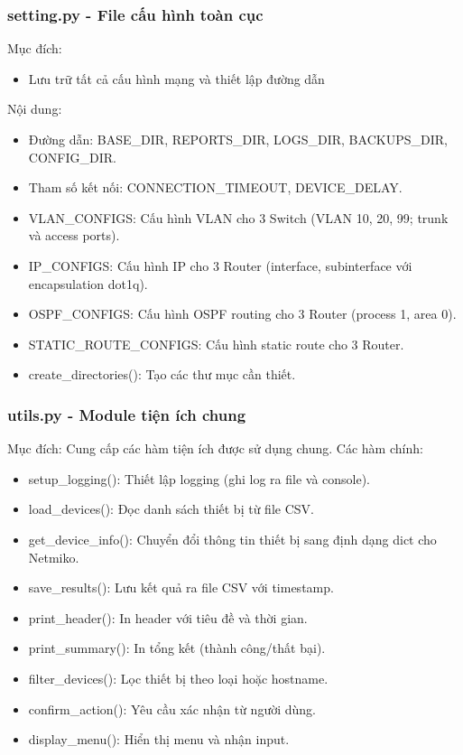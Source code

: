 \subsubsection{setting.py - File cấu hình toàn cục}
    Mục đích:
    \begin{itemize}
        \item Lưu trữ tất cả cấu hình mạng và thiết lập đường dẫn
    \end{itemize}
    Nội dung:
    \begin{itemize}
        \item Đường dẫn: BASE\_DIR, REPORTS\_DIR, LOGS\_DIR, BACKUPS\_DIR, CONFIG\_DIR.
        \item Tham số kết nối: CONNECTION\_TIMEOUT, DEVICE\_DELAY.
        \item VLAN\_CONFIGS: Cấu hình VLAN cho 3 Switch (VLAN 10, 20, 99; trunk và access ports).
        \item IP\_CONFIGS: Cấu hình IP cho 3 Router (interface, subinterface với encapsulation dot1q).
        \item OSPF\_CONFIGS: Cấu hình OSPF routing cho 3 Router (process 1, area 0).
        \item STATIC\_ROUTE\_CONFIGS: Cấu hình static route cho 3 Router.
        \item create\_directories(): Tạo các thư mục cần thiết.
    \end{itemize}
\subsubsection{utils.py - Module tiện ích chung}

    Mục đích: Cung cấp các hàm tiện ích được sử dụng chung.
    Các hàm chính:
    
    \begin{itemize}
        \item setup\_logging(): Thiết lập logging (ghi log ra file và console).
        \item load\_devices(): Đọc danh sách thiết bị từ file CSV.
        \item get\_device\_info(): Chuyển đổi thông tin thiết bị sang định dạng dict cho Netmiko.
        \item save\_results(): Lưu kết quả ra file CSV với timestamp.
        \item print\_header(): In header với tiêu đề và thời gian.
        \item print\_summary(): In tổng kết (thành công/thất bại).
        \item filter\_devices(): Lọc thiết bị theo loại hoặc hostname.
        \item confirm\_action(): Yêu cầu xác nhận từ người dùng.
        \item display\_menu(): Hiển thị menu và nhận input.
    \end{itemize}
        
